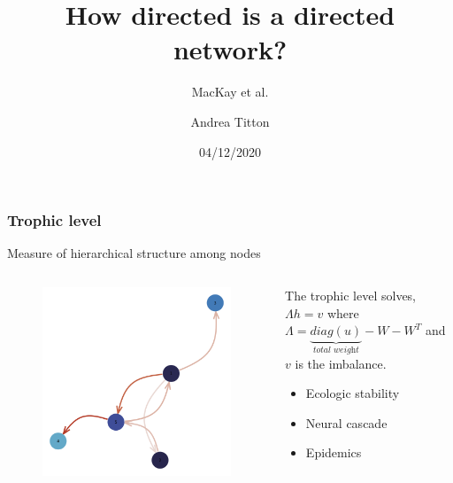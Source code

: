 \documentclass{beamer}
\title{How directed is a directed network?}
\subtitle{MacKay et al.}
\author{Andrea Titton}
\institute{Tinbergen Institute}
\date{04/12/2020}
\begin{document}
\frame{\titlepage}
\nocite{*}

\begin{frame}
    \frametitle{Trophic level}
    Measure of hierarchical structure among nodes
    \begin{columns}
        \begin{column}{.49\textwidth}
            \begin{figure}
                \includegraphics[width=0.8\linewidth,height=0.8\textheight,keepaspectratio]{../../plots/presentations/lv-network.png}
            \end{figure}
        \end{column}
        \begin{column}{.48\textwidth}
            The trophic level solves,
            $\Lambda h = v$ where
            $\Lambda = \underbrace{diag(u)}_{\textit{total weight}} - W - W^T$
            and $v$ is the imbalance.
            \hspace{2\unitlength}
            \begin{itemize}
                \item Ecologic stability
                \item Neural cascade
                \item Epidemics
            \end{itemize}
        \end{column}
    \end{columns}
\end{frame}
\end{document}
